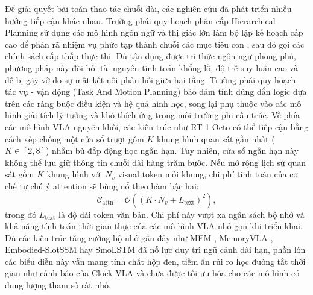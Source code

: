 Để giải quyết bài toán thao tác chuỗi dài, các nghiên cứu đã phát triển nhiều hướng tiếp cận khác nhau. Trường phái quy hoạch phân cấp Hierarchical Planning sử dụng các mô hình ngôn ngữ và thị giác lớn làm bộ lập kế hoạch cấp cao để phân rã nhiệm vụ phức tạp thành chuỗi các mục tiêu con \cite{saycan2022,innermonologue2022,codeaspolicies2023,voxposer2023}, sau đó gọi các chính sách cấp thấp thực thi. Dù tận dụng được tri thức ngôn ngữ phong phú, phương pháp này đòi hỏi tài nguyên tính toán khổng lồ, độ trễ suy luận cao và dễ bị gãy vỡ do sự mất kết nối phản hồi giữa hai tầng. Trường phái quy hoạch tác vụ - vận động (Task And Motion Planning) \cite{garrett2021tamp} bảo đảm tính đúng đắn logic dựa trên các ràng buộc điều kiện và hệ quả hình học, song lại phụ thuộc vào các mô hình giải tích lý tưởng và khó thích ứng trong môi trường phi cấu trúc. Về phía các mô hình VLA nguyên khối, các kiến trúc như RT-1 \cite{rt12022} Octo \cite{octo2024} có thể tiếp cận bằng cách xếp chồng một cửa sổ trượt gồm $K$ khung hình quan sát gần nhất ($K \in [2, 8]$) nhằm bù đắp động học ngắn hạn. Tuy nhiên, cửa sổ ngắn hạn này không thể lưu giữ thông tin chuỗi dài hàng trăm bước. Nếu mở rộng lịch sử quan sát gồm $K$ khung hình với $N_v$ visual token mỗi khung, chi phí tính toán của cơ chế tự chú ý attention sẽ bùng nổ theo hàm bậc hai:
\begin{equation}
\mathcal{C}_{\mathrm{attn}} = \mathcal{O}\left((K \cdot N_v + L_{\mathrm{text}})^2\right),
\label{eq:quadratic-attention}
\end{equation}
trong đó $L_{\mathrm{text}}$ là độ dài token văn bản. Chi phí này vượt xa ngân sách bộ nhớ và khả năng tính toán thời gian thực của các mô hình VLA nhỏ gọn khi triển khai. Dù các kiến trúc tăng cường bộ nhớ gần đây như MEM \cite{mem2026}, MemoryVLA \cite{memoryvla2026}, Embodied-SlotSSM \cite{liberomem2025} hay SmoLSTM \cite{smoLSTM2026} đã nỗ lực duy trì ngữ cảnh dài hạn, phần lớn các biểu diễn này vẫn mang tính chất hộp đen, tiềm ẩn rủi ro học đường tắt thời gian như cảnh báo của Clock VLA \cite{clockvla2026} và chưa được tối ưu hóa cho các mô hình có dung lượng tham số rất nhỏ.

